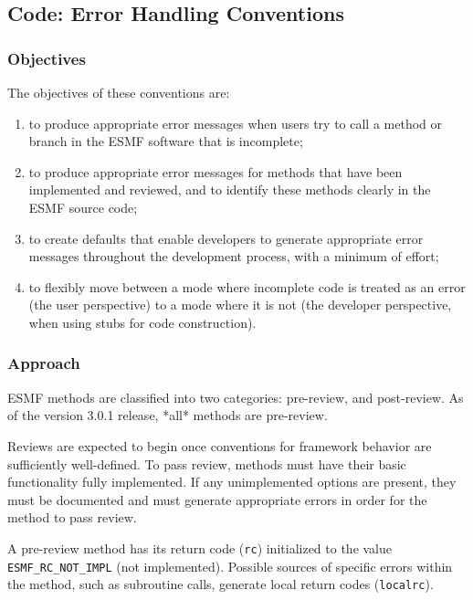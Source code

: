 
\subsection{Code: Error Handling Conventions}

\subsubsection{Objectives}

The objectives of these conventions are:

\begin{enumerate}
\item to produce appropriate error messages when users try to call a method or branch in the ESMF software that is incomplete;
\item to produce appropriate error messages for methods that have been implemented and reviewed, and to identify these methods clearly in the ESMF source code;
\item to create defaults that enable developers to generate appropriate error messages throughout the development process, with a minimum of effort;
\item to flexibly move between a mode where incomplete code is treated as an error (the user perspective) to a mode where it is not (the developer perspective, when using stubs for code construction).
\end{enumerate}

\subsubsection{Approach}

ESMF methods are classified into two categories: pre-review, and post-review. As of the version 3.0.1 release, *all* methods are pre-review.

Reviews are expected to begin once conventions for framework behavior are sufficiently well-defined. To pass review, methods must have their basic functionality fully implemented. If any unimplemented options are present, they must be documented and must generate appropriate errors in order for the method to pass review.

A pre-review method has its return code ({\tt rc}) initialized to the value {\tt ESMF\_RC\_NOT\_IMPL} (not implemented). Possible sources of specific errors within the method, such as subroutine calls, generate local return codes ({\tt localrc}).

